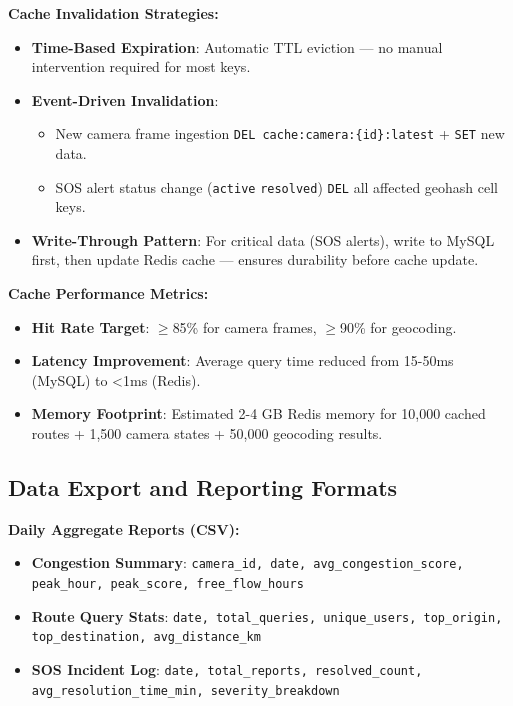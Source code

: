 \textbf{Cache Invalidation Strategies:}
\begin{itemize}
    \item \textbf{Time-Based Expiration}: Automatic TTL eviction — no manual intervention required for most keys.
    \item \textbf{Event-Driven Invalidation}:
    \begin{itemize}
        \item New camera frame ingestion \textrightarrow{} \texttt{DEL cache:camera:\{id\}:latest} + \texttt{SET} new data.
        \item SOS alert status change (\texttt{active} \textrightarrow{} \texttt{resolved}) \textrightarrow{} \texttt{DEL} all affected geohash cell keys.
    \end{itemize}
    \item \textbf{Write-Through Pattern}: For critical data (SOS alerts), write to MySQL first, then update Redis cache — ensures durability before cache update.
\end{itemize}

\textbf{Cache Performance Metrics:}
\begin{itemize}
    \item \textbf{Hit Rate Target}: $\geq$85\% for camera frames, $\geq$90\% for geocoding.
    \item \textbf{Latency Improvement}: Average query time reduced from 15-50ms (MySQL) to <1ms (Redis).
    \item \textbf{Memory Footprint}: Estimated 2-4 GB Redis memory for 10,000 cached routes + 1,500 camera states + 50,000 geocoding results.
\end{itemize}

\subsection{Data Export and Reporting Formats}

\textbf{Daily Aggregate Reports (CSV):}
\begin{itemize}
    \item \textbf{Congestion Summary}: \texttt{camera\_id, date, avg\_congestion\_score, peak\_hour, peak\_score, free\_flow\_hours}
    \item \textbf{Route Query Stats}: \texttt{date, total\_queries, unique\_users, top\_origin, top\_destination, avg\_distance\_km}
    \item \textbf{SOS Incident Log}: \texttt{date, total\_reports, resolved\_count, avg\_resolution\_time\_min, severity\_breakdown}
\end{itemize}

